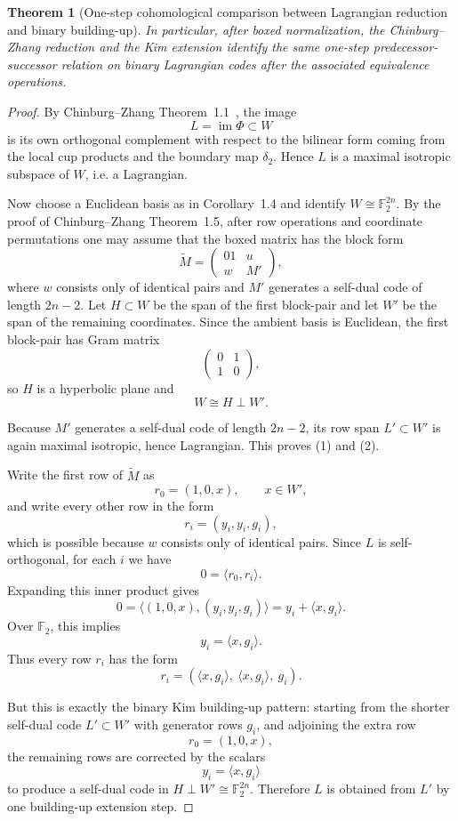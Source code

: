 \documentclass[12pt]{article}
\newtheorem{theorem}{Theorem}[section]
\newenvironment{blueblock}{\begingroup\color{blue}}{\endgroup}
\begin{document}
\begin{blueblock}
\begin{theorem}[One-step cohomological comparison between Lagrangian reduction and binary building-up]
In particular, after boxed normalization, the Chinburg--Zhang reduction and the Kim extension identify the same one-step predecessor-successor relation on binary Lagrangian codes after the associated equivalence operations.
\end{theorem}

\begin{proof}
By Chinburg--Zhang Theorem~1.1~\cite{ChinburgZhang}, the image
\[
L=\operatorname{im}\Phi \subset W
\]
is its own orthogonal complement with respect to the bilinear form coming from the local cup products
and the boundary map \(\delta_2\). Hence \(L\) is a maximal isotropic subspace of \(W\), i.e. a
Lagrangian.

Now choose a Euclidean basis as in Corollary~1.4 and identify \(W\cong \mathbb F_2^{2n}\).
By the proof of Chinburg--Zhang Theorem~1.5, after row operations and coordinate permutations
one may assume that the boxed matrix has the block form
\[
\widetilde M=
\begin{pmatrix}
01 & u\\
w & M'
\end{pmatrix},
\]
where \(w\) consists only of identical pairs and \(M'\) generates a self-dual code of length \(2n-2\).
Let \(H\subset W\) be the span of the first block-pair and let \(W'\) be the span of the remaining
coordinates. Since the ambient basis is Euclidean, the first block-pair has Gram matrix
\[
\begin{pmatrix}
0&1\\
1&0
\end{pmatrix},
\]
so \(H\) is a hyperbolic plane and
\[
W\cong H\perp W'.
\]

Because \(M'\) generates a self-dual code of length \(2n-2\), its row span \(L'\subset W'\) is again
maximal isotropic, hence Lagrangian. This proves (1) and (2).

Write the first row of \(\widetilde M\) as
\[
r_0=(1,0,x), \qquad x\in W',
\]
and write every other row in the form
\[
r_i=(y_i,y_i,g_i),
\]
which is possible because \(w\) consists only of identical pairs. Since \(L\) is self-orthogonal,
for each \(i\) we have
\[
0=\langle r_0,r_i\rangle.
\]
Expanding this inner product gives
\[
0=\langle (1,0,x),(y_i,y_i,g_i)\rangle
   = y_i+\langle x,g_i\rangle.
\]
Over \(\mathbb F_2\), this implies
\[
y_i=\langle x,g_i\rangle.
\]
Thus every row \(r_i\) has the form
\[
r_i=(\langle x,g_i\rangle,\ \langle x,g_i\rangle,\ g_i).
\]

But this is exactly the binary Kim building-up pattern: starting from the shorter self-dual code
\(L'\subset W'\) with generator rows \(g_i\), and adjoining the extra row
\[
r_0=(1,0,x),
\]
the remaining rows are corrected by the scalars
\[
y_i=\langle x,g_i\rangle
\]
to produce a self-dual code in \(H\perp W'\cong \mathbb F_2^{2n}\).
Therefore \(L\) is obtained from \(L'\) by one building-up extension step.


\end{proof}
\end{blueblock}
\end{document}
